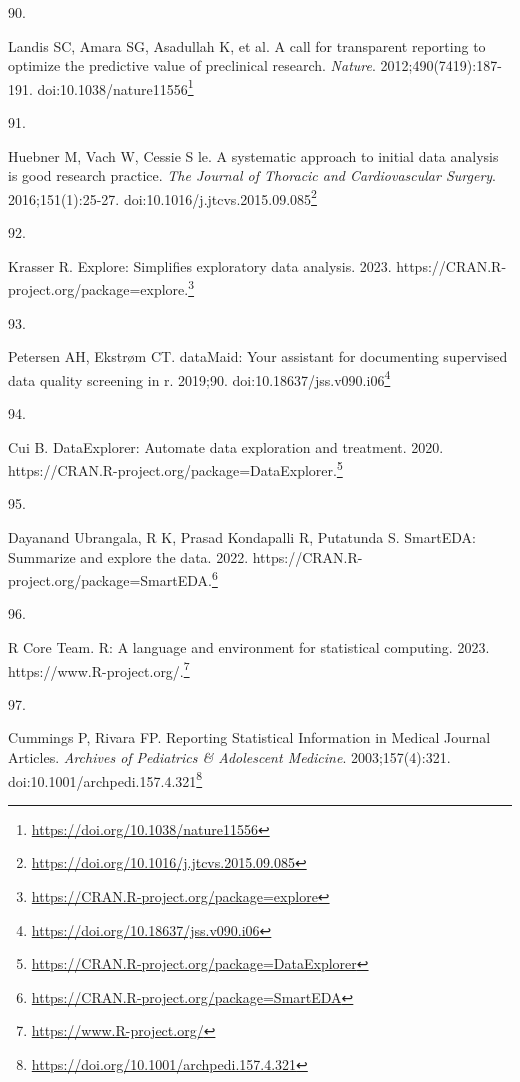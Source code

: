 \documentclass[
  a4paper,
]{book}
\newlength{\cslhangindent}
\newlength{\csllabelwidth}
\newlength{\cslentryspacingunit} %
\newenvironment{CSLReferences}[2] %
 {%
  \setlength{\parindent}{0pt}
  \ifodd #1
  \let\oldpar\par
  \def\par{\hangindent=\cslhangindent\oldpar}
  \fi
  \setlength{\parskip}{#2\cslentryspacingunit}
 }%
 {}
\newcommand{\CSLLeftMargin}[1]{\parbox[t]{\csllabelwidth}{#1}}
\newcommand{\CSLRightInline}[1]{\parbox[t]{\linewidth - \csllabelwidth}{#1}\break}
\renewcommand{\href}[2]{#2\footnote{\url{#1}}}
\begin{document}
\begin{CSLReferences}{0}{0}
\leavevmode{}%
\CSLLeftMargin{90. }%
\CSLRightInline{Landis SC, Amara SG, Asadullah K, et al. A call for transparent reporting to optimize the predictive value of preclinical research. \emph{Nature}. 2012;490(7419):187-191. doi:\href{https://doi.org/10.1038/nature11556}{10.1038/nature11556}}

\leavevmode{}%
\CSLLeftMargin{91. }%
\CSLRightInline{Huebner M, Vach W, Cessie S le. A systematic approach to initial data analysis is good research practice. \emph{The Journal of Thoracic and Cardiovascular Surgery}. 2016;151(1):25-27. doi:\href{https://doi.org/10.1016/j.jtcvs.2015.09.085}{10.1016/j.jtcvs.2015.09.085}}

\leavevmode{}%
\CSLLeftMargin{92. }%
\CSLRightInline{Krasser R. Explore: Simplifies exploratory data analysis. 2023. \href{https://CRAN.R-project.org/package=explore}{https://CRAN.R-project.org/package=explore.}}

\leavevmode{}%
\CSLLeftMargin{93. }%
\CSLRightInline{Petersen AH, Ekstrøm CT. {\textbraceleft}dataMaid{\textbraceright}: Your assistant for documenting supervised data quality screening in {\textbraceleft}r{\textbraceright}. 2019;90. doi:\href{https://doi.org/10.18637/jss.v090.i06}{10.18637/jss.v090.i06}}

\leavevmode{}%
\CSLLeftMargin{94. }%
\CSLRightInline{Cui B. DataExplorer: Automate data exploration and treatment. 2020. \href{https://CRAN.R-project.org/package=DataExplorer}{https://CRAN.R-project.org/package=DataExplorer.}}

\leavevmode{}%
\CSLLeftMargin{95. }%
\CSLRightInline{Dayanand Ubrangala, R K, Prasad Kondapalli R, Putatunda S. SmartEDA: Summarize and explore the data. 2022. \href{https://CRAN.R-project.org/package=SmartEDA}{https://CRAN.R-project.org/package=SmartEDA.}}

\leavevmode{}%
\CSLLeftMargin{96. }%
\CSLRightInline{R Core Team. R: A language and environment for statistical computing. 2023. \href{https://www.R-project.org/}{https://www.R-project.org/.}}

\leavevmode{}%
\CSLLeftMargin{97. }%
\CSLRightInline{Cummings P, Rivara FP. Reporting Statistical Information in Medical Journal Articles. \emph{Archives of Pediatrics \& Adolescent Medicine}. 2003;157(4):321. doi:\href{https://doi.org/10.1001/archpedi.157.4.321}{10.1001/archpedi.157.4.321}}


\end{CSLReferences}
\end{document}
